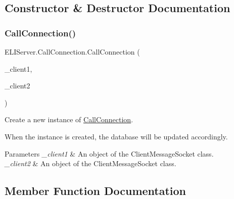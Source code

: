 \subsection{Constructor \& Destructor Documentation}
\mbox{\label{class_e_l_i_server_1_1_call_connection_ad0182673abc1aaffa6f4f539a727f782}} 
\subsubsection{\texorpdfstring{Call\+Connection()}{CallConnection()}}
{\footnotesize\ttfamily E\+L\+I\+Server.\+Call\+Connection.\+Call\+Connection (\begin{DoxyParamCaption}\item[{\hyperlink{class_e_l_i_server_1_1_messaging_1_1_client_message_socket}{Client\+Message\+Socket}}]{\+\_\+client1,  }\item[{\hyperlink{class_e_l_i_server_1_1_messaging_1_1_client_message_socket}{Client\+Message\+Socket}}]{\+\_\+client2 }\end{DoxyParamCaption})\hspace{0.3cm}{\ttfamily [inline]}}





Create a new instance of \hyperlink{class_e_l_i_server_1_1_call_connection}{Call\+Connection}.

When the instance is created, the database will be updated accordingly. 


\begin{DoxyParams}{Parameters}
{\em \+\_\+client1} & An object of the Client\+Message\+Socket class.\\
\hline
{\em \+\_\+client2} & An object of the Client\+Message\+Socket class.\\
\hline
\end{DoxyParams}


\subsection{Member Function Documentation}
\mbox{\label{class_e_l_i_server_1_1_call_connection_a58cfbc1878bb29632972ed7c21c580bb}} 
